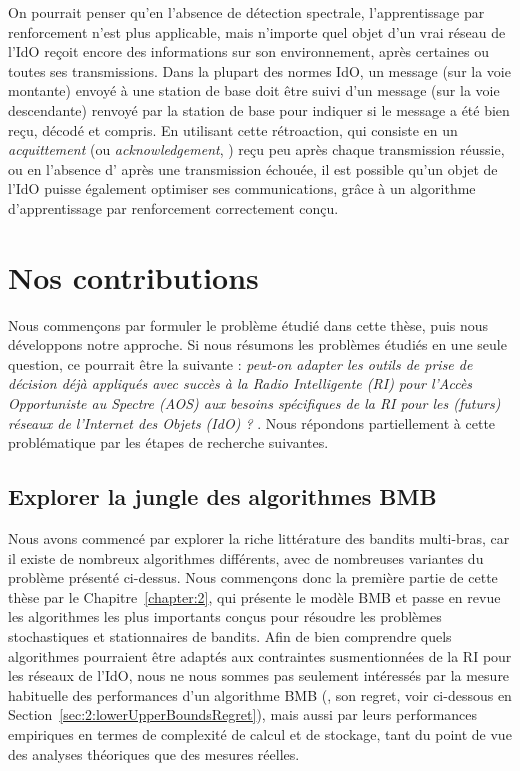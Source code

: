 \begin{resume_fr}
On pourrait penser qu'en l'absence de détection spectrale, l'apprentissage par renforcement n'est plus applicable, mais n'importe quel objet d'un vrai réseau de l'IdO reçoit encore des informations sur son environnement, après certaines ou toutes ses transmissions.
Dans la plupart des normes IdO, un message (sur la voie montante) envoyé à une station de base doit être suivi d'un message (sur la voie descendante) renvoyé par la station de base pour indiquer si le message a été bien reçu, décodé et compris.
%
En utilisant cette rétroaction, qui consiste en un \emph{acquittement} (ou \emph{acknowledgement}, \Ack) reçu peu après chaque transmission réussie, ou en l'absence d'\Ack{} après une transmission échouée, il est possible qu'un objet de l'IdO puisse également optimiser ses communications, grâce à un algorithme d'apprentissage par renforcement correctement conçu.



\section*{Nos contributions}

Nous commençons par formuler le problème étudié dans cette thèse, puis nous développons notre approche.
%
Si nous résumons les problèmes étudiés en une seule question, ce pourrait être la suivante :
\guillemotleft{} \emph{peut-on adapter les outils de prise de décision déjà appliqués avec succès à la Radio Intelligente (RI) pour l'Accès Opportuniste au Spectre (AOS) aux besoins spécifiques de la RI pour les (futurs) réseaux de l'Internet des Objets (IdO) ?} \guillemotright.
%
Nous répondons partiellement à cette problématique par les étapes de recherche suivantes.



\subsection*{Explorer la jungle des algorithmes BMB}

%
Nous avons commencé par explorer la riche littérature des bandits multi-bras,
car il existe de nombreux algorithmes différents, avec de nombreuses variantes du problème présenté ci-dessus.
Nous commençons donc la première partie de cette thèse par le Chapitre~\ref{chapter:2}, qui présente le modèle BMB et passe en revue les algorithmes les plus importants conçus pour résoudre les problèmes stochastiques et stationnaires de bandits.
%
Afin de bien comprendre quels algorithmes pourraient être adaptés aux contraintes susmentionnées de la RI pour les réseaux de l'IdO,
nous ne nous sommes pas seulement intéressés par la mesure habituelle des performances d'un algorithme BMB (\ie, son regret, voir ci-dessous en Section~\ref{sec:2:lowerUpperBoundsRegret}),
mais aussi par leurs performances empiriques en termes de complexité de calcul et de stockage, tant du point de vue des analyses théoriques que des mesures réelles.



\end{resume_fr}
